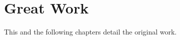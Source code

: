 \section{Great Work}
\label{s:GreatWork}

This and the following chapters detail the original work.
